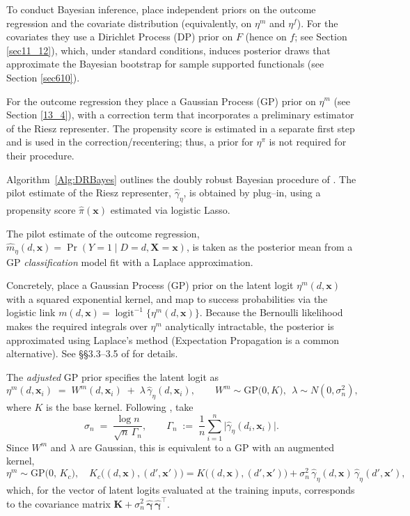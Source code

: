To conduct Bayesian inference, \cite{breunig2025double} place independent priors on the outcome regression and the covariate distribution (equivalently, on $\eta^m$ and $\eta^f$). For the covariates they use a Dirichlet Process (DP) prior on $F$ (hence on $f$; see Section \ref{sec11_12}), which, under standard conditions, induces posterior draws that approximate the Bayesian bootstrap for sample supported functionals \cite{Lo1987BayesianBootstrap} (see Section \ref{sec610}). 

For the outcome regression they place a Gaussian Process (GP) prior on $\eta^m$ (see Section \ref{13_4}), with a correction term that incorporates a preliminary estimator of the Riesz representer. The propensity score is estimated in a separate first step and is used in the correction/recentering; thus, a prior for $\eta^\pi$ is not required for their procedure.

Algorithm~\ref{Alg:DRBayes} outlines the doubly robust Bayesian procedure of \cite{breunig2025double}. 
The pilot estimate of the Riesz representer, $\hat\gamma_\eta$, is obtained by plug–in, using a propensity score $\hat\pi(\mathbf{x})$ estimated via logistic Lasso.
 
The pilot estimate of the outcome regression, $\hat m_\eta(d,\mathbf{x})=\Pr(Y=1\mid D=d,\mathbf{X}=\mathbf{x})$, is taken as the posterior mean from a GP \emph{classification} model fit with a Laplace approximation.

Concretely, place a Gaussian Process (GP) prior on the latent logit
$\eta^m(d,\mathbf{x})$ with a squared exponential kernel, and map to
success probabilities via the logistic link
$m(d,\mathbf{x})=\operatorname{logit}^{-1}\{\eta^m(d,\mathbf{x})\}$.
Because the Bernoulli likelihood makes the required integrals over
$\eta^m$ analytically intractable, the posterior is approximated using
Laplace’s method (Expectation Propagation is a common alternative).
See \S\S3.3–3.5 of \cite{rasmussen2006gaussian} for details.

The \emph{adjusted} GP prior specifies the latent logit as
\[
\eta^m(d,\mathbf{x}_i)
\;=\;
W^m(d,\mathbf{x}_i)\;+\;\lambda\,\widehat{\gamma}_\eta(d,\mathbf{x}_i),
\qquad
W^m \sim \mathrm{GP}\!\big(0, K\big),\ \ \lambda \sim N(0,\sigma_n^2),
\]
where $K$ is the base kernel. Following \cite{breunig2025double},
take
\[
\sigma_n \;=\; \frac{\log n}{\sqrt{n}\,\Gamma_n},
\qquad
\Gamma_n \;:=\; \frac{1}{n}\sum_{i=1}^n
\big|\widehat{\gamma}_\eta(d_i,\mathbf{x}_i)\big|.
\]
Since $W^m$ and $\lambda$ are Gaussian, this is equivalent to a GP with
an augmented kernel,
\[
\eta^m \sim \mathrm{GP}\!\big(0,\, K_c\big),
\quad
K_c\big((d,\mathbf{x}),(d',\mathbf{x}')\big)
= K\big((d,\mathbf{x}),(d',\mathbf{x}')\big)
+ \sigma_n^2\,\widehat{\gamma}_\eta(d,\mathbf{x})\,
\widehat{\gamma}_\eta(d',\mathbf{x}'),
\]
which, for the vector of latent logits evaluated at the training inputs,
corresponds to the covariance matrix
$\mathbf{K} + \sigma_n^2\,\widehat{\boldsymbol{\gamma}}\,
\widehat{\boldsymbol{\gamma}}^{\top}$. 

